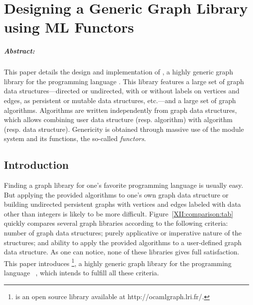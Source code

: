
\chapter{Designing a Generic Graph Library using ML Functors}



\addtocounter{footnote}{2}


\paragraph{Abstract:}
  This paper details the design and implementation of \ocamlgraph, a
  highly generic graph library for the programming language \ocaml.
  This library features a large set of graph data
  structures---directed or undirected, with or without labels on
  vertices and edges, as persistent or mutable data structures,
  etc.---and a large set of graph algorithms.  Algorithms are written
  independently from graph data structures, which allows combining
  user data structure (resp. algorithm) with \ocamlgraph algorithm
  (resp. data structure).  Genericity is obtained through massive use
  of the \ocaml module system and its functions, the so-called
  \emph{functors}.



\section{Introduction}

Finding a graph library for one's favorite programming language is
usually easy. But applying the provided algorithms to one's own graph
data structure or building undirected persistent graphs with vertices
and edges labeled with data other than integers is likely to be more
difficult. Figure~\ref{XII:comparison:tab} quickly compares several graph
libraries according to the following criteria: number of graph data
structures; purely applicative or imperative nature of the structures;
and ability to apply the provided algorithms to a user-defined graph
data structure.  As one can notice, none of these libraries gives full
satisfaction.  This paper introduces
\ocamlgraph\footnote{\ocamlgraph is an open source library available
  at \textrm{http://ocamlgraph.lri.fr/}.}, a
highly generic graph library for the programming language
\ocaml~\cite{XII:ObjectiveCaml}, which intends to fulfill all these
criteria.

